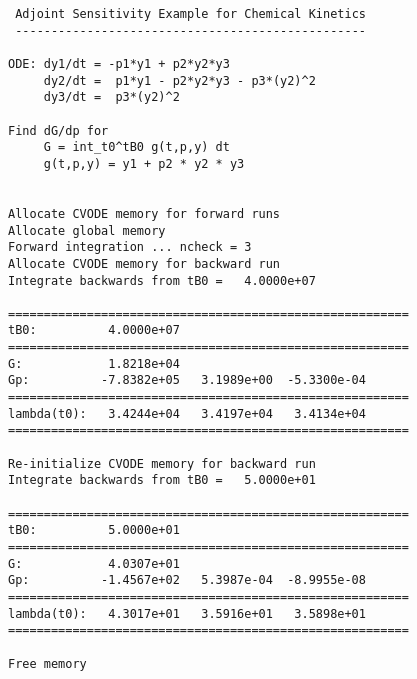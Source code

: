 \begin{verbatim}
 Adjoint Sensitivity Example for Chemical Kinetics
 -------------------------------------------------

ODE: dy1/dt = -p1*y1 + p2*y2*y3
     dy2/dt =  p1*y1 - p2*y2*y3 - p3*(y2)^2
     dy3/dt =  p3*(y2)^2

Find dG/dp for
     G = int_t0^tB0 g(t,p,y) dt
     g(t,p,y) = y1 + p2 * y2 * y3


Allocate CVODE memory for forward runs
Allocate global memory
Forward integration ... ncheck = 3
Allocate CVODE memory for backward run
Integrate backwards from tB0 =   4.0000e+07

========================================================
tB0:          4.0000e+07 
========================================================
G:            1.8218e+04 
Gp:          -7.8382e+05   3.1989e+00  -5.3300e-04
========================================================
lambda(t0):   3.4244e+04   3.4197e+04   3.4134e+04
========================================================

Re-initialize CVODE memory for backward run
Integrate backwards from tB0 =   5.0000e+01

========================================================
tB0:          5.0000e+01 
========================================================
G:            4.0307e+01 
Gp:          -1.4567e+02   5.3987e-04  -8.9955e-08
========================================================
lambda(t0):   4.3017e+01   3.5916e+01   3.5898e+01
========================================================

Free memory
\end{verbatim}